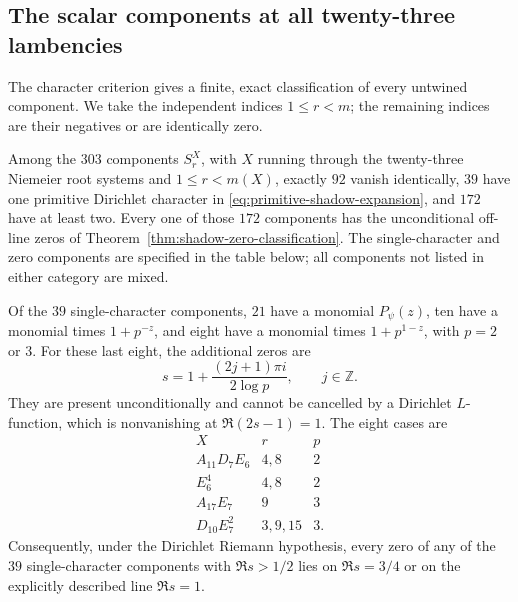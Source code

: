 \subsection{The scalar components at all twenty-three lambencies}
\label{sec:all-lambency-classification}
The character criterion gives a finite, exact classification of every
untwined component.  We take the independent indices $1\leq r<m$; the
remaining indices are their negatives or are identically zero.

\begin{proposition}\label{prop:all-scalar-shadows}
Among the $303$ components $S^X_r$, with $X$ running through the twenty-three
Niemeier root systems and $1\leq r<m(X)$, exactly $92$ vanish identically,
$39$ have one primitive Dirichlet character in
\eqref{eq:primitive-shadow-expansion}, and $172$ have at least two.
Every one of those $172$ components has the unconditional off-line zeros
of Theorem~\ref{thm:shadow-zero-classification}.
The single-character and zero components are specified in the table below;
all components not listed in either category are mixed.

Of the $39$ single-character components, $21$ have a monomial
$P_\psi(z)$, ten have a monomial times $1+p^{-z}$, and eight have a monomial
times $1+p^{1-z}$, with $p=2$ or $3$.
For these last eight, the additional zeros are
\begin{equation}\label{eq:scalar-shadow-boundary-zeros}
 s=1+\frac{(2j+1)\pi i}{2\log p},\qquad j\in\mathbb Z.
\end{equation}
They are present unconditionally and cannot be cancelled by a Dirichlet
$L$-function, which is nonvanishing at $\Re(2s-1)=1$.
The eight cases are
\[
 \begin{array}{c|c|c}
 X&r&p\\\hline
 A_{11}D_7E_6&4,8&2\\
 E_6^4&4,8&2\\
 A_{17}E_7&9&3\\
 D_{10}E_7^2&3,9,15&3.
 \end{array}
\]
Consequently, under the Dirichlet Riemann hypothesis, every zero of any of
the $39$ single-character components with $\Re s>1/2$ lies on
$\Re s=3/4$ or on the explicitly described line $\Re s=1$.
\end{proposition}

